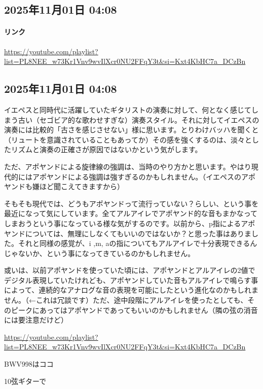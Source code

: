 \subsection*{2025年11月01日 04:08}

\paragraph{リンク}
\url{https://youtube.com/playlist?list=PL8NEE_w73Kr1Vnv9wvIlXcr0NU2FFqY3t&si=Kxt4KbHC7a_DCzBn}

\subsection*{2025年11月01日 04:08}

イエペスと同時代に活躍していたギタリストの演奏に対して、何となく感じてしまう古い（セゴビア的な歌わせすぎな）演奏スタイル。それに対してイエペスの演奏には比較的「古さを感じさせない」様に思います。とりわけバッハを聞くと（リュートを意識されていることもあってか）その感を強くするのは、淡々としたリズムと演奏の正確さが原因ではないかという気がします。

ただ、アポヤンドによる旋律線の強調は、当時のやり方かと思います。やはり現代的にはアポヤンドによる強調は強すぎるのかもしれません。（イエペスのアポヤンドも嫌ほど聞こえてきますから）

そもそも現代では、どうもアポヤンドって流行っていない？らしい、という事を最近になって気にしています。全てアルアイレでアポヤンド的な音もまかなってしまおうという事になっている様な気がするのです。以前から、p指によるアポヤンドについては、無理にしなくてもいいのではないか？と思った事はありました。それと同様の感覚が、i ,m, aの指についてもアルアイレで十分表現できるんじゃないか、という事になってきているのかもしれません。

或いは、以前アポヤンドを使っていた頃には、アポヤンドとアルアイレの2値でデジタル表現していたけれども、アポヤンドしていた音もアルアイレで鳴らす事によって、連続的なアナログな音の表現を可能にしたという進化なのかもしれません。（←これは冗談です）ただ、途中段階にアルアイレを使ったとしても、そのピークにあってはアポヤンドであってもいいのかもしれません（隣の弦の消音には要注意だけど）

\url{https://youtube.com/playlist?list=PL8NEE_w73Kr1Vnv9wvIlXcr0NU2FFqY3t&si=Kxt4KbHC7a_DCzBn}

BWV998はココ

10弦ギターで

